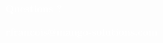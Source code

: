 \documentclass[smaller]{beamer}
\begin{document}
{
 \begin{frame}[plain]

\begin{Huge}\textcolor{white}{\sf \bfseries Questions ?}\end{Huge}

\begin{flushright}
 \begin{Large}
\textcolor{white}{\bfseries \ttfamily rfrancois@mango-solutions.com}  
 \end{Large}
\end{flushright}


 \end{frame}
}
\end{document}
